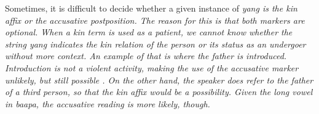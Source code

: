
% 
% 
% 


Sometimes, it is difficult to decide whether a given instance of \em yang \em is the kin affix or the accusative postposition.  The reason for this is that both markers are optional. When a kin term is used as a patient, we cannot know whether the string \em yang \em indicates the kin relation of the person or its status as an undergoer without more context. An example of that is  where the father is introduced. Introduction is not a violent activity, making the use of the accusative marker unlikely, but still possible . On the other hand, the speaker does refer to the father of a third person, so that the kin affix would be a possibility. Given the long vowel in \em baapa\em, the accusative reading is more likely, though.




